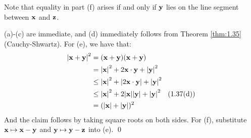 \noindent Note that equality in part (f) arises if and only if $\mathbf{y}$ lies on the line segment between $\mathbf{x}$ and $\mathbf{z}$.
\begin{nproof}
    (a)-(c) are immediate, and (d) immediately follows from Theorem \ref{thm:1.35} (Cauchy-Shwartz). For (e), we have that:
    \begin{align*}
        \abs{\mathbf{x} + \mathbf{y}}^2 &= (\mathbf{x} + \mathbf{y})(\mathbf{x} + \mathbf{y})
        \\ &= \abs{\mathbf{x}}^2 + 2\mathbf{x}\cdot\mathbf{y} + \abs{\mathbf{y}}^2
        \\ &\leq \abs{\mathbf{x}}^2 + \abs{2\mathbf{x}\cdot\mathbf{y}} + \abs{\mathbf{y}}^2
        \\ &\leq \abs{\mathbf{x}}^2 + 2\abs{\mathbf{x}}\abs{\mathbf{y}} + \abs{\mathbf{y}}^2 \quad \text{(1.37(d))}
        \\ &= (\abs{\mathbf{x}} + \abs{\mathbf{y}})^2
    \end{align*}
    And the claim follows by taking square roots on both sides. For (f), substitute $\mathbf{x} \mapsto \mathbf{x} - \mathbf{y}$ and $\mathbf{y} \mapsto \mathbf{y} - \mathbf{z}$ into (e). \qed
\end{nproof}


